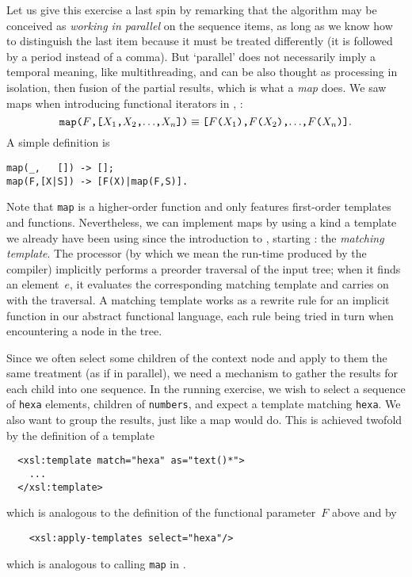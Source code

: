 Let us give this exercise a last spin by remarking that the algorithm
may be conceived as \emph{working in parallel} on the sequence items,
as long as we know how to distinguish the last item because it must
be treated differently (it is followed by a period instead of a
comma). But `parallel' does not necessarily imply a temporal meaning,
like multithreading, and can be also thought as processing in
isolation, then fusion of the partial results, which is what a
\emph{map} does. We saw maps when introducing functional iterators in
\Erlang, :
\begin{equation*}
\texttt{map(\(F\),[\(X_1\),\(X_2\),\(\ldots\),\(X_{n}\)])}
\equiv
\texttt{[\(F\)(\(X_1\)),\(F\)(\(X_2\)),\(\ldots\),\(F\)(\(X_{n}\))]}.
\end{equation*}
A simple definition is
\begin{verbatim}
map(_,   []) -> [];
map(F,[X|S]) -> [F(X)|map(F,S)].
\end{verbatim}
Note that \texttt{map} is a higher\hyp{}order function and \XSLT only
features first\hyp{}order templates and functions. Nevertheless, we
can implement maps by using a kind a template we already have been
using since the introduction to \XSLT, starting
: the \emph{matching template}. The \XSLT
processor (by which we mean the run\hyp{}time produced by the \XSLT
compiler) implicitly performs a preorder traversal of the input \XML
tree; when it finds an element~\(e\), it evaluates the corresponding
matching template and carries on with the traversal. A matching
template works as a rewrite rule for an implicit function in our
abstract functional language, each rule being tried in turn when
encountering a node in the \XML tree.

Since we often select some children of the context node and apply to
them the same treatment (as if in parallel), we need a mechanism to
gather the results for each child into one sequence. In the running
exercise, we wish to select a sequence of \texttt{hexa} elements,
children of \texttt{numbers}, and expect a template matching
\texttt{hexa}. We also want to group the results, just like a map
would do. This is achieved twofold by the definition of a template
\begin{verbatim}
  <xsl:template match="hexa" as="text()*">
    ...
  </xsl:template>
\end{verbatim}
which is analogous to the definition of the functional parameter~\(F\)
above and by
\begin{verbatim}
    <xsl:apply-templates select="hexa"/>
\end{verbatim}
which is analogous to calling \texttt{map} in
\Erlang.\label{match_as_map}

